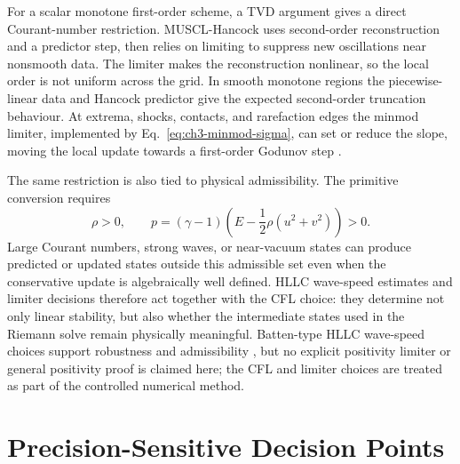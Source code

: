 For a scalar monotone first-order scheme, a TVD argument gives a direct
Courant-number restriction. MUSCL-Hancock uses second-order reconstruction and a
predictor step, then relies on limiting to suppress new oscillations near
nonsmooth data. The limiter makes the reconstruction nonlinear, so the local
order is not uniform across the grid. In smooth monotone regions the
piecewise-linear data and Hancock predictor give the expected second-order
truncation behaviour. At extrema, shocks, contacts, and rarefaction edges the
minmod limiter, implemented by Eq.~\eqref{eq:ch3-minmod-sigma}, can set or reduce the slope,
moving the local update towards a first-order Godunov step
\citep{vanleer_1979,toro2009}.

The same restriction is also tied to physical admissibility. The primitive
conversion requires
\begin{equation}\label{eq:ch3-positivity}
  \rho > 0,
  \qquad
  p=(\gamma-1)\left(E-\frac12\rho(u^2+v^2)\right)>0 .
\end{equation}
Large Courant numbers, strong waves, or near-vacuum states can produce predicted
or updated states outside this admissible set even when the conservative update
is algebraically well defined. HLLC wave-speed estimates and limiter decisions
therefore act together with the CFL choice: they determine not only linear
stability, but also whether the intermediate states used in the Riemann solve
remain physically meaningful. Batten-type HLLC wave-speed choices support
robustness and admissibility \citep{batten_etal_1997}, but no explicit
positivity limiter or general positivity proof is claimed here; the CFL and
limiter choices are treated as part of the controlled numerical method.

\section{Precision-Sensitive Decision Points}
\label{sec:precision-sensitive-decisions}
